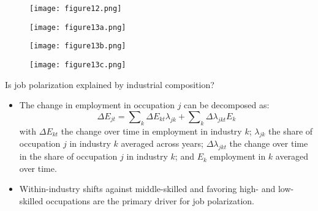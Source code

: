 \documentclass[notes=show]{beamer}
\begin{document}
\newpage
\begin{center}
\begin{figure}
\texttt{[image: figure12.png]}
\end{figure} 
\end{center}
\newpage

\newpage
\begin{center}
\begin{figure}
\texttt{[image: figure13a.png]}
\end{figure} 
\end{center}
\newpage

\newpage
\begin{center}
\begin{figure}
\texttt{[image: figure13b.png]}
\end{figure} 
\end{center}
\newpage

\newpage
\begin{center}
\begin{figure}
\texttt{[image: figure13c.png]}
\end{figure} 
\end{center}
\newpage

\begin{frame}{Is job polarization explained by industrial composition?}
\begin{itemize}
\item The change in employment in occupation $j$ can be decomposed as:
\[
\Delta E_{jt}=\sum\nolimits_{k} \Delta E_{kt} \lambda_{jk}+\sum\nolimits_{k} \Delta \lambda _{jkt} E_{k} \tag{1} \label{eq1}
\]
with $ \Delta E_{kt}$ the change over time in employment in industry $k$; $ \lambda_{jk}$ the share of occupation $j$ in industry $k$ averaged across years; $ \Delta \lambda_{jkt}$ the change over time in the share of occupation $j$ in industry $k$; and $ E_{k}$ employment in $k$ averaged over time.\medskip
\item Within-industry shifts against middle-skilled and favoring high- and low-skilled occupations are the primary driver for job polarization.
\end{itemize}
\end{frame}
\end{document}
